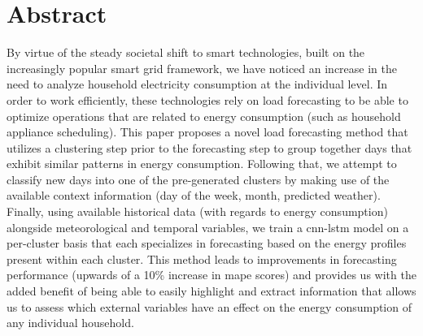 \clearpage
{}
{}

\begingroup
\let\clearpage\relax
\let\cleardoublepage\relax
\let\cleardoublepage\relax

\chapter*{Abstract}
By virtue of the steady societal shift to smart technologies, built on the increasingly popular smart grid framework, we have noticed an increase in the need to analyze household electricity consumption at the individual level. In order to work efficiently, these technologies rely on load forecasting to be able to optimize operations that are related to energy consumption (such as household appliance scheduling). This paper proposes a novel load forecasting method that utilizes a clustering step prior to the forecasting step to group together days that exhibit similar patterns in energy consumption. Following that, we attempt to classify new days into one of the pre-generated clusters by making use of the available context information (day of the week, month, predicted weather). Finally, using available historical data (with regards to energy consumption) alongside meteorological and temporal variables, we train a \gls{cnn-lstm} model on a per-cluster basis that each specializes in forecasting based on the energy profiles present within each cluster. This method leads to improvements in forecasting performance (upwards of a 10\% increase in \gls{mape} scores) and provides us with the added benefit of being able to easily highlight and extract information that allows us to assess which external variables have an effect on the energy consumption of any individual household.

\vfill

\endgroup

\vfill